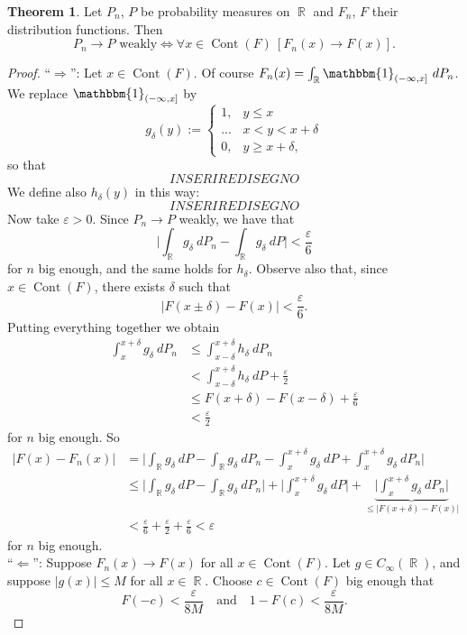 \documentclass[12pt,a4paper]{report}
\theoremstyle{definition}
\newtheorem{theorem}{Theorem}[chapter] %
\theoremstyle{num.custom-title}
\DeclareMathOperator{\R}{\mathbb{R}}
\DeclareMathOperator{\imp}{\Rightarrow}
\DeclareMathOperator{\pmi}{\Leftarrow}
\DeclareMathOperator{\Cont}{Cont}
\newcommand{\IFF}{\Longleftrightarrow}
\renewcommand{\epsilon}{\varepsilon}
\renewcommand{\1}{\mathbbm{1}}
\begin{document}
\begin{theorem}
Let $P_n$, $P$ be probability measures on $\R$ and $F_n$, $F$ their distribution functions. Then
\[
P_n \to P \text{ weakly} \IFF \forall x \in \Cont(F) \ [F_n(x) \to F(x)].
\]
\begin{proof}
``$\imp$'': Let $x \in \Cont(F)$. Of course $F_n(x) = \int_{\R} \1_{(-\infty,x]} \ dP_n$. We replace $\1_{(-\infty,x]}$ by
\[
g_\delta(y) :=
\begin{cases}
1, & y \leq x \\
... & x < y < x+\delta \\
0, & y \geq x+\delta,
\end{cases}
\]
so that
\[
INSERIRE DISEGNO
\]
We define also $h_\delta(y)$ in this way:
\[
INSERIRE DISEGNO
\]
Now take $\epsilon > 0$. Since $P_n \to P$ weakly, we have that
\[
\Big| \int_{\R} g_\delta \ dP_n - \int_{\R} g_\delta \ dP \Big| < \frac{\epsilon}{6}
\]
for $n$ big enough, and the same holds for $h_\delta$. Observe also that, since $x \in \Cont(F)$, there exists $\delta$ such that
\[
|F(x \pm \delta) - F(x)| < \frac{\epsilon}{6}. \tag{$*$}
\]
Putting everything together we obtain
\begin{align*}
\int_x^{x+\delta} g_\delta \ dP_n 
&\leq \int_{x-\delta}^{x+\delta} h_\delta \ dP_n \\
&< \int_{x-\delta}^{x+\delta} h_\delta \ dP + \frac{\epsilon}{2} \\
&\leq F(x+\delta) - F(x-\delta) + \frac{\epsilon}{6} \tag{because $h_\delta \leq 1$} \\
&< \frac{\epsilon}{2} \tag{by $(*)$}
\end{align*}
for $n$ big enough. So
\begin{align*}
|F(x)-F_n(x)| 
&= \Big| \int_{\R} g_\delta \ dP - \int_{\R} g_\delta \ dP_n - \int_x^{x+\delta} g_\delta \ dP + \int_x^{x+\delta} g_\delta \ dP_n \Big| \\
&\leq \Big| \int_{\R} g_\delta \ dP - \int_{\R} g_\delta \ dP_n \Big| + \Big| \int_x^{x+\delta} g_\delta \ dP \Big| + \underbrace{\Big| \int_x^{x+\delta} g_\delta \ dP_n \Big|}_{\leq |F(x+\delta)-F(x)|} \\
&< \frac{\epsilon}{6} + \frac{\epsilon}{2} + \frac{\epsilon}{6} < \epsilon
\end{align*}
for $n$ big enough.
\\[6pt]
``$\pmi$'': Suppose $F_n(x) \to F(x)$ for all $x \in \Cont(F)$. Let $g \in C_\infty(\R)$, and suppose $|g(x)| \leq M$ for all $x \in \R$. Choose $c \in \Cont(F)$ big enough that
\[
F(-c) < \frac{\epsilon}{8M} \quad \text{and} \quad 1-F(c) < \frac{\epsilon}{8M}.
\]
\end{proof}
\end{theorem}
\end{document}
